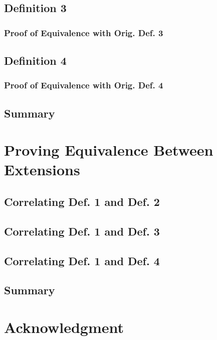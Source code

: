 \documentclass[conference]{IEEEtran}
\begin{document}
\subsection{Definition 3}

\subsubsection{Proof of Equivalence with Orig. Def. 3}

\subsection{Definition 4}

\subsubsection{Proof of Equivalence with Orig. Def. 4}

\subsection{Summary}

\section{Proving Equivalence Between Extensions}

\subsection{Correlating Def. 1 and Def. 2}

\subsection{Correlating Def. 1 and Def. 3}

\subsection{Correlating Def. 1 and Def. 4}

\subsection{Summary}

\section*{Acknowledgment}
\end{document}
